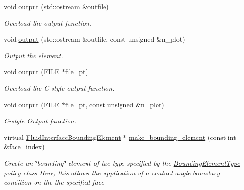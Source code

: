 \begin{DoxyCompactItemize}
void \hyperlink{classoomph_1_1SpineUpdateFluidInterfaceElement_ae2875e70d1f8eacc229ea3d4318f7de4}{output} (std\+::ostream \&outfile)
\begin{DoxyCompactList}\small\item\em Overload the output function. \end{DoxyCompactList}\item 
void \hyperlink{classoomph_1_1SpineUpdateFluidInterfaceElement_a3c9c00def11f68f48db0f46004f1e6fe}{output} (std\+::ostream \&outfile, const unsigned \&n\+\_\+plot)
\begin{DoxyCompactList}\small\item\em Output the element. \end{DoxyCompactList}\item 
void \hyperlink{classoomph_1_1SpineUpdateFluidInterfaceElement_a963fdd8b603e563da9fb966e0c429457}{output} (F\+I\+LE $\ast$file\+\_\+pt)
\begin{DoxyCompactList}\small\item\em Overload the C-\/style output function. \end{DoxyCompactList}\item 
void \hyperlink{classoomph_1_1SpineUpdateFluidInterfaceElement_af876d90d19b6faa253260193ded3f175}{output} (F\+I\+LE $\ast$file\+\_\+pt, const unsigned \&n\+\_\+plot)
\begin{DoxyCompactList}\small\item\em C-\/style Output function. \end{DoxyCompactList}\item 
virtual \hyperlink{classoomph_1_1FluidInterfaceBoundingElement}{Fluid\+Interface\+Bounding\+Element} $\ast$ \hyperlink{classoomph_1_1SpineUpdateFluidInterfaceElement_a8e464c689a19ce2d6fbff2c167dcc41a}{make\+\_\+bounding\+\_\+element} (const int \&face\+\_\+index)
\begin{DoxyCompactList}\small\item\em Create an \char`\"{}bounding\char`\"{} element of the type specified by the \hyperlink{classoomph_1_1BoundingElementType}{Bounding\+Element\+Type} policy class Here, this allows the application of a contact angle boundary condition on the the specified face. \end{DoxyCompactList}\end{DoxyCompactItemize}
